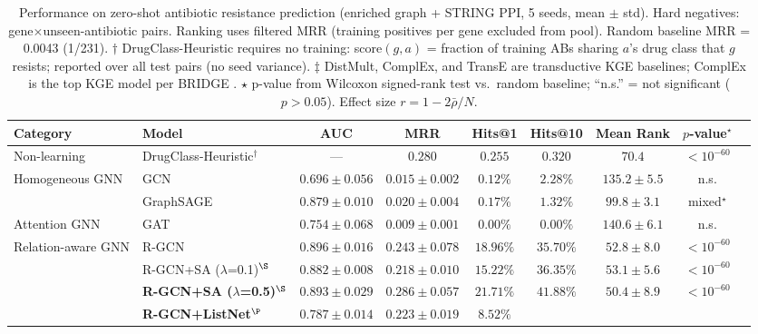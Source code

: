 \begin{table}[t]
\centering
\caption{Performance on zero-shot antibiotic resistance prediction (enriched graph + STRING PPI, 5 seeds, mean $\pm$ std). Hard negatives: gene$\times$unseen-antibiotic pairs. Ranking uses filtered MRR (training positives per gene excluded from pool). Random baseline MRR = 0.0043 (1/231). $\dagger$ DrugClass-Heuristic requires no training: score$(g,a)$ = fraction of training ABs sharing $a$'s drug class that $g$ resists; reported over all test pairs (no seed variance). $\ddagger$ DistMult, ComplEx, and TransE are transductive KGE baselines; ComplEx is the top KGE model per BRIDGE \cite{bessadok2026bridge}. $\star$ p-value from Wilcoxon signed-rank test vs.\ random baseline; ``n.s.'' = not significant ($p > 0.05$). Effect size $r = 1 - 2\bar{\rho}/N$.}
\label{tab:results}
\begin{tabular}{llccccccc}
\toprule
\textbf{Category} & \textbf{Model} & \textbf{AUC} & \textbf{MRR} & \textbf{Hits@1} & \textbf{Hits@10} & \textbf{Mean Rank} & \textbf{$p$-value$^\star$} \\
\midrule
Non-learning
  & DrugClass-Heuristic$^\dagger$
    & ---
    & $\mathbf{0.280}$
    & $0.255$
    & $0.320$
    & $70.4$
    & $< 10^{-60}$ \\
\midrule
\multirow{2}{*}{Homogeneous GNN}
  & GCN
    & $0.696 \pm 0.056$
    & $0.015 \pm 0.002$
    & $0.12\%$
    & $2.28\%$
    & $135.2 \pm 5.5$
    & n.s. \\
  & GraphSAGE
    & $0.879 \pm 0.010$
    & $0.020 \pm 0.004$
    & $0.17\%$
    & $1.32\%$
    & $99.8 \pm 3.1$
    & mixed$^\star$ \\
\midrule
Attention GNN
  & GAT
    & $0.754 \pm 0.068$
    & $0.009 \pm 0.001$
    & $0.00\%$
    & $0.00\%$
    & $140.6 \pm 6.1$
    & n.s. \\
\midrule
\multirow{5}{*}{Relation-aware GNN}
  & R-GCN
    & $0.896 \pm 0.016$
    & $0.243 \pm 0.078$
    & $18.96\%$
    & $35.70\%$
    & $52.8 \pm 8.0$
    & $< 10^{-60}$ \\
  & R-GCN+SA ($\lambda$=0.1)$^\S$
    & $0.882 \pm 0.008$
    & $0.218 \pm 0.010$
    & $15.22\%$
    & $36.35\%$
    & $53.1 \pm 5.6$
    & $< 10^{-60}$ \\
  & \textbf{R-GCN+SA ($\lambda$=0.5)$^\S$}
    & $0.893 \pm 0.029$
    & $\mathbf{0.286 \pm 0.057}$
    & $\mathbf{21.71\%}$
    & $41.88\%$
    & $50.4 \pm 8.9$
    & $< 10^{-60}$ \\
  & \textbf{R-GCN+ListNet$^\P$}
    & $0.787 \pm 0.014$
    & $0.223 \pm 0.019$
    & $8.52\%$

\end{tabular}
\end{table}
